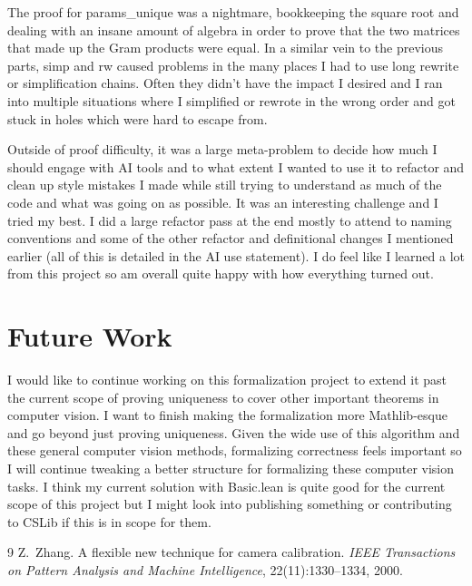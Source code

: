 \documentclass[10pt]{article}
\theoremstyle{plain}
\theoremstyle{definition}
\theoremstyle{remark}
\newcommand{\lean}[1]{{\ttfamily\let\us\_\def\_{\us\allowbreak}#1}}
\begin{document}
The proof for \lean{params\_unique} was a nightmare, bookkeeping the square root and dealing with an insane amount of algebra in order to prove that the two matrices that made up the Gram products were equal. In a similar vein to the previous parts, \lean{simp} and \lean{rw} caused problems in the many places I had to use long rewrite or simplification chains. Often they didn't have the impact I desired and I ran into multiple situations where I simplified or rewrote in the wrong order and got stuck in holes which were hard to escape from.

Outside of proof difficulty, it was a large meta-problem to decide how much I should engage with AI tools and to what extent I wanted to use it to refactor and clean up style mistakes I made while still trying to understand as much of the code and what was going on as possible. It was an interesting challenge and I tried my best. I did a large refactor pass at the end mostly to attend to naming conventions and some of the other refactor and definitional changes I mentioned earlier (all of this is detailed in the AI use statement). I do feel like I learned a lot from this project so am overall quite happy with how everything turned out.

\section{Future Work}

I would like to continue working on this formalization project to extend it past the current scope of proving uniqueness to cover other important theorems in computer vision. I want to finish making the formalization more Mathlib-esque and go beyond just proving uniqueness. Given the wide use of this algorithm and these general computer vision methods, formalizing correctness feels important so I will continue tweaking a better structure for formalizing these computer vision tasks. I think my current solution with \lean{Basic.lean} is quite good for the current scope of this project but I might look into publishing something or contributing to CSLib if this is in scope for them.

\begin{thebibliography}{9}
  Z.~Zhang.
  A flexible new technique for camera calibration.
  \emph{IEEE Transactions on Pattern Analysis and Machine Intelligence},
  22(11):1330--1334, 2000.
\end{thebibliography}
\end{document}
